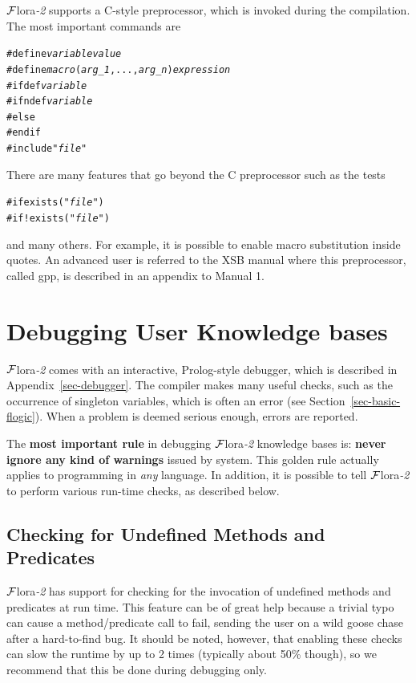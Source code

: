 \documentclass[11pt]{article}
\newcommand{\FLORA}{{\mbox{\sc ${\cal F}${lora}\rm\emph{-2}}}\xspace}
\newcommand{\FLSYSTEM}{\FLORA}
\begin{document}
\FLSYSTEM supports a C-style preprocessor, which is invoked during the
compilation. The most important commands are
\begin{alltt}
   #define \emph{variable} \emph{value} 
   #define \emph{macro}(\emph{arg_1},...,\emph{arg_n}) \emph{expression} 
   #ifdef \emph{variable} 
   #ifndef \emph{variable} 
   #else
   #endif
   #include "\emph{file}" 
\end{alltt}
There are many features that go beyond the C preprocessor such as the tests
\begin{alltt}
   #if exists("\emph{file}") 
   #if !exists("\emph{file}") 
\end{alltt}
and many others. For example, it is possible to enable macro substitution
inside quotes. An advanced user is referred to the XSB manual where this
preprocessor, called gpp, is described in an appendix to Manual 1.


\section{Debugging User Knowledge bases}\label{sec-debugging}

\FLSYSTEM comes with an interactive, Prolog-style debugger, which is described
in Appendix~\ref{sec-debugger}. The compiler makes many useful checks, such
as the occurrence of singleton variables, which is often an error (see
Section~\ref{sec-basic-flogic}). When a problem is deemed serious enough,
errors are reported.

The \textbf{most important rule}  
in debugging \FLSYSTEM knowledge bases is: \textbf{never
  ignore any kind of warnings} issued by system. This golden rule actually
applies to programming in \emph{any} language.  In addition, it is possible
to tell \FLSYSTEM to perform various run-time checks, as described below.

\subsection{Checking for Undefined Methods and Predicates}\label{sec-undef}

\FLSYSTEM has support for checking for the invocation of undefined methods and
predicates at run time. This feature can be of great help because a trivial
typo can cause a method/predicate call to fail, sending the user on a
wild goose chase after a hard-to-find bug. It should be noted, however,
that enabling these checks can slow the runtime by up to 2 times (typically
about 50\% though), so we recommend that this be done during debugging only.
\end{document}
